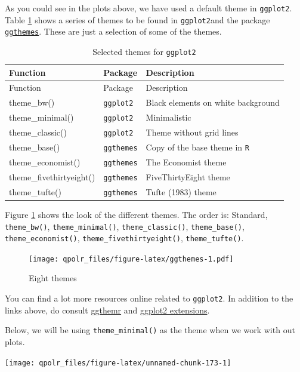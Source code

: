 \documentclass[12pt,oneside]{reedthesis}
\theoremstyle{definition}
\theoremstyle{definition}
\theoremstyle{definition}
\theoremstyle{remark}
\begin{document}
  As you could see in the plots above, we have used a default theme in
  \texttt{ggplot2}. Table \ref{tab:ggthemes} shows a series of themes to
  be found in \texttt{ggplot2}and the package
  \href{https://cran.r-project.org/web/packages/ggthemes/vignettes/ggthemes.html}{\texttt{ggthemes}}.
  These are just a selection of some of the themes.
  \begin{longtable}[]{@{}lll@{}}
  \caption{\label{tab:ggthemes} Selected themes for
  \texttt{ggplot2}}\tabularnewline
  \toprule
  Function & Package & Description\tabularnewline
  \midrule
  \endfirsthead
  \toprule
  Function & Package & Description\tabularnewline
  \midrule
  \endhead
  theme\_bw() & \texttt{ggplot2} & Black elements on white
  background\tabularnewline
  theme\_minimal() & \texttt{ggplot2} & Minimalistic\tabularnewline
  theme\_classic() & \texttt{ggplot2} & Theme without grid
  lines\tabularnewline
  theme\_base() & \texttt{ggthemes} & Copy of the base theme in
  \texttt{R}\tabularnewline
  theme\_economist() & \texttt{ggthemes} & The Economist
  theme\tabularnewline
  theme\_fivethirtyeight() & \texttt{ggthemes} & FiveThirtyEight
  theme\tabularnewline
  theme\_tufte() & \texttt{ggthemes} & Tufte (1983) theme\tabularnewline
  \bottomrule
  \end{longtable}
  Figure \ref{fig:ggthemes} shows the look of the different themes. The
  order is: Standard, \texttt{theme\_bw()}, \texttt{theme\_minimal()},
  \texttt{theme\_classic()}, \texttt{theme\_base()},
  \texttt{theme\_economist()}, \texttt{theme\_fivethirtyeight()},
  \texttt{theme\_tufte()}.
  \begin{figure}
  \centering
  \texttt{[image: qpolr\_files/figure-latex/ggthemes-1.pdf]}
  \caption{\label{fig:ggthemes}Eight themes}
  \end{figure}
  You can find a lot more resources online related to \texttt{ggplot2}. In
  addition to the links above, do consult
  \href{https://github.com/cttobin/ggthemr}{ggthemr} and
  \href{https://www.ggplot2-exts.org/}{ggplot2 extensions}.
  
  Below, we will be using \texttt{theme\_minimal()} as the theme when we
  work with out plots.
  \begin{Shaded}
  \begin{Highlighting}[]
  \NormalTok{(}\OperatorTok{+}
  \StringTok{  }\NormalTok{(} \NormalTok{) }\OperatorTok{+}\StringTok{ }
  \StringTok{  }\NormalTok{(}\NormalTok{) }\OperatorTok{+}
  \StringTok{  }\NormalTok{()}
  \end{Highlighting}
  \end{Shaded}
  \begin{center}\texttt{[image: qpolr\_files/figure-latex/unnamed-chunk-173-1]} \end{center}
  
\end{document}
